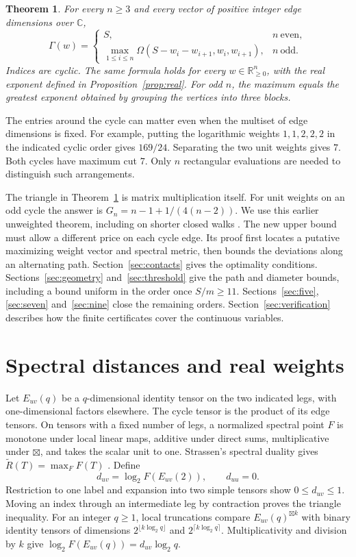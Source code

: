 \documentclass[11pt,a4paper]{article}
\newtheorem{theorem}{Theorem}[section]
\theoremstyle{definition}
\newcommand{\Rtil}{\widetilde R}
\begin{document}
\begin{theorem}\label{thm:main}
For every \(n\ge3\) and every vector of positive integer edge dimensions over \(\mathbb C\),
\[
 \boxed{\displaystyle
 \Gamma(w)=
 \begin{cases}
 S, & n\ \text{even},\\[2pt]
 \max_{1\le i\le n}\Omega(S-w_i-w_{i+1},w_i,w_{i+1}),
       & n\ \text{odd}.
 \end{cases}}
\]
Indices are cyclic. The same formula holds for every \(w\in\mathbb R_{\ge0}^n\), with the real exponent defined in Proposition~\ref{prop:real}. For odd \(n\), the maximum equals the greatest exponent obtained by grouping the vertices into three blocks.
\end{theorem}

The entries around the cycle can matter even when the multiset of edge dimensions is fixed. For example, putting the logarithmic weights \(1,1,2,2,2\) in the indicated cyclic order gives \(169/24\). Separating the two unit weights gives \(7\). Both cycles have maximum cut \(7\). Only \(n\) rectangular evaluations are needed to distinguish such arrangements.

The triangle in Theorem~\ref{thm:main} is matrix multiplication itself. For unit weights on an odd cycle the answer is \(G_n=n-1+1/(4(n-2))\). We use this earlier unweighted theorem, including on shorter closed walks \cite{Jiang}. The new upper bound must allow a different price on each cycle edge. Its proof first locates a putative maximizing weight vector and spectral metric, then bounds the deviations along an alternating path. Section~\ref{sec:contacts} gives the optimality conditions. Sections~\ref{sec:geometry} and~\ref{sec:threshold} give the path and diameter bounds, including a bound uniform in the order once \(S/m\ge11\). Sections~\ref{sec:five}, \ref{sec:seven} and~\ref{sec:nine} close the remaining orders. Section~\ref{sec:verification} describes how the finite certificates cover the continuous variables.

\section{Spectral distances and real weights}\label{sec:spectrum}

Let \(E_{uv}(q)\) be a \(q\)-dimensional identity tensor on the two indicated legs, with one-dimensional factors elsewhere. The cycle tensor is the product of its edge tensors. On tensors with a fixed number of legs, a normalized spectral point \(F\) is monotone under local linear maps, additive under direct sums, multiplicative under \(\boxtimes\), and takes the scalar unit to one. Strassen's spectral duality gives \(\Rtil(T)=\max_F F(T)\) \cite{Strassen,Zhou}. Define
\[
 d_{uv}=\log_2 F(E_{uv}(2)),\qquad d_{uu}=0 .
\]
Restriction to one label and expansion into two simple tensors show \(0\le d_{uv}\le1\). Moving an index through an intermediate leg by contraction proves the triangle inequality. For an integer \(q\ge1\), local truncations compare \(E_{uv}(q)^{\boxtimes k}\) with binary identity tensors of dimensions \(2^{\lfloor k\log_2q\rfloor}\) and \(2^{\lceil k\log_2q\rceil}\). Multiplicativity and division by \(k\) give
\(\log_2 F(E_{uv}(q))=d_{uv}\log_2q\).
\end{document}

